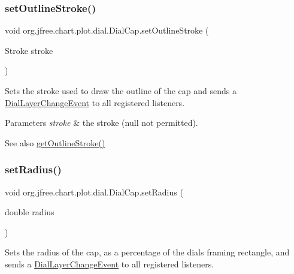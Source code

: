 \subsubsection{\texorpdfstring{set\+Outline\+Stroke()}{setOutlineStroke()}}
{\footnotesize\ttfamily void org.\+jfree.\+chart.\+plot.\+dial.\+Dial\+Cap.\+set\+Outline\+Stroke (\begin{DoxyParamCaption}\item[{Stroke}]{stroke }\end{DoxyParamCaption})}

Sets the stroke used to draw the outline of the cap and sends a \mbox{\hyperlink{classorg_1_1jfree_1_1chart_1_1plot_1_1dial_1_1_dial_layer_change_event}{Dial\+Layer\+Change\+Event}} to all registered listeners.


\begin{DoxyParams}{Parameters}
{\em stroke} & the stroke ({\ttfamily null} not permitted).\\
\hline
\end{DoxyParams}
\begin{DoxySeeAlso}{See also}
\mbox{\hyperlink{classorg_1_1jfree_1_1chart_1_1plot_1_1dial_1_1_dial_cap_a6bb21a21b3417917b4e1a9e3a89c9c9a}{get\+Outline\+Stroke()}} 
\end{DoxySeeAlso}
\mbox{\label{classorg_1_1jfree_1_1chart_1_1plot_1_1dial_1_1_dial_cap_ad614d37cf451d4909c1a4de4ba2da69e}} 
\subsubsection{\texorpdfstring{set\+Radius()}{setRadius()}}
{\footnotesize\ttfamily void org.\+jfree.\+chart.\+plot.\+dial.\+Dial\+Cap.\+set\+Radius (\begin{DoxyParamCaption}\item[{double}]{radius }\end{DoxyParamCaption})}

Sets the radius of the cap, as a percentage of the dial\textquotesingle{}s framing rectangle, and sends a \mbox{\hyperlink{classorg_1_1jfree_1_1chart_1_1plot_1_1dial_1_1_dial_layer_change_event}{Dial\+Layer\+Change\+Event}} to all registered listeners.


